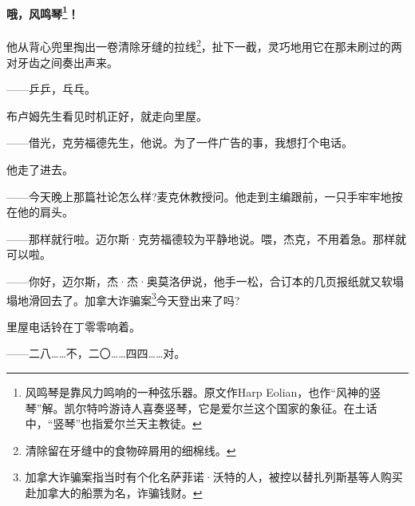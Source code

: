 \paragraph*{哦，风鸣琴\footnote{风鸣琴是靠风力鸣响的一种弦乐器。原文作Harp Eolian，也作“风神的竖琴”解。凯尔特吟游诗人喜奏竖琴，它是爱尔兰这个国家的象征。在土话中，“竖琴”也指爱尔兰天主教徒。}！}
\par 他从背心兜里掏出一卷清除牙缝的拉线\footnote{清除留在牙缝中的食物碎屑用的细棉线。}，扯下一截，灵巧地用它在那未刷过的两对牙齿之间奏出声来。
\par ——乒乒，乓乓。
\par 布卢姆先生看见时机正好，就走向里屋。
\par ——借光，克劳福德先生，他说。为了一件广告的事，我想打个电话。
\par 他走了进去。
\par ——今天晚上那篇社论怎么样?麦克休教授问。他走到主编跟前，一只手牢牢地按在他的肩头。
\par ——那样就行啦。迈尔斯·克劳福德较为平静地说。喂，杰克，不用着急。那样就可以啦。
\par ——你好，迈尔斯，杰·杰·奥莫洛伊说，他手一松，合订本的几页报纸就又软塌塌地滑回去了。加拿大诈骗案\footnote{加拿大诈骗案指当时有个化名萨菲诺·沃特的人，被控以替扎列斯基等人购买赴加拿大的船票为名，诈骗钱财。}今天登出来了吗?
\par 里屋电话铃在丁零零响着。
\par ——二八……不，二〇……四四……对。
